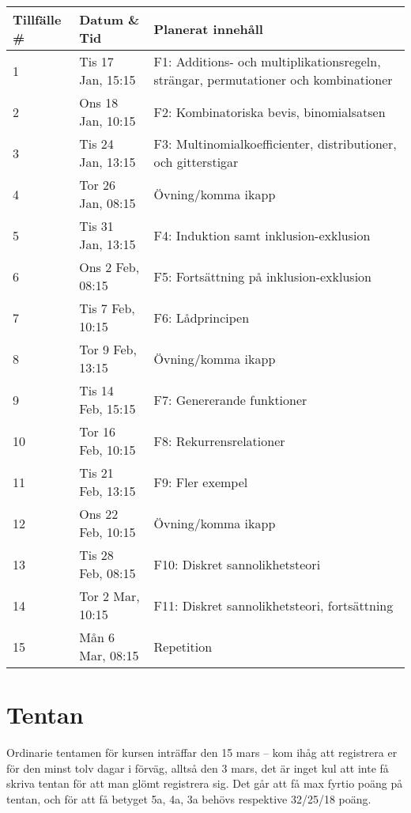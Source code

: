 \documentclass{tufte-handout}
\begin{document}
\begin{table}[h]
\begin{tabular}{lll}
Tillfälle \# & Datum \& Tid      & Planerat innehåll \\ \hline
1            & Tis 17 Jan, 15:15 & F1: Additions- och multiplikationsregeln, strängar, permutationer och kombinationer\\
2            & Ons 18 Jan, 10:15 & F2: Kombinatoriska bevis, binomialsatsen\\
3            & Tis 24 Jan, 13:15 & F3: Multinomialkoefficienter, distributioner, och gitterstigar\\
4            & Tor 26 Jan, 08:15 & Övning/komma ikapp\\
5	      & Tis 31 Jan, 13:15 & F4: Induktion samt inklusion-exklusion\\
6            & Ons 2 Feb, 08:15 & F5: Fortsättning på inklusion-exklusion\\
7            & Tis 7 Feb, 10:15  & F6: Lådprincipen\\
8            & Tor 9 Feb, 13:15  & Övning/komma ikapp\\
9            & Tis 14 Feb, 15:15 & F7: Genererande funktioner\\
10            & Tor 16 Feb, 10:15 & F8: Rekurrensrelationer\\
11            & Tis 21 Feb, 13:15 & F9: Fler exempel\\
12           & Ons 22 Feb, 10:15 & Övning/komma ikapp\\
13           & Tis 28 Feb, 08:15 & F10: Diskret sannolikhetsteori\\
14           & Tor 2 Mar, 10:15  & F11: Diskret sannolikhetsteori, fortsättning\footnotemark{}\\
15           & Mån 6 Mar, 08:15 & Repetition
\end{tabular}
\end{table}

\section{Tentan}

Ordinarie tentamen för kursen inträffar den 15 mars -- kom ihåg att registrera er för den minst tolv dagar i förväg, alltså den 3 mars, det är inget kul att inte få skriva tentan för att man glömt registrera sig. Det går att få max fyrtio poäng på tentan, och för att få betyget 5a, 4a, 3a behövs respektive 32/25/18 poäng.
\end{document}
